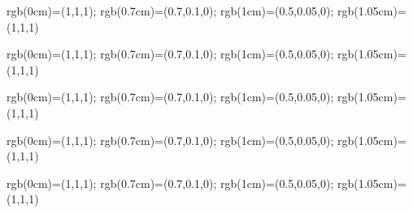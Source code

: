 \documentclass{article}
\begin{document}

% 
{rgb(0cm)=(1,1,1);
rgb(0.7cm)=(0.7,0.1,0); rgb(1cm)=(0.5,0.05,0); rgb(1.05cm)=(1,1,1)}

% 
{rgb(0cm)=(1,1,1);
rgb(0.7cm)=(0.7,0.1,0); rgb(1cm)=(0.5,0.05,0); rgb(1.05cm)=(1,1,1)}


% 
{rgb(0cm)=(1,1,1);
rgb(0.7cm)=(0.7,0.1,0); rgb(1cm)=(0.5,0.05,0); rgb(1.05cm)=(1,1,1)}


% 
{rgb(0cm)=(1,1,1);
rgb(0.7cm)=(0.7,0.1,0); rgb(1cm)=(0.5,0.05,0); rgb(1.05cm)=(1,1,1)}

% 
{rgb(0cm)=(1,1,1);
rgb(0.7cm)=(0.7,0.1,0); rgb(1cm)=(0.5,0.05,0); rgb(1.05cm)=(1,1,1)}



\end{document}
